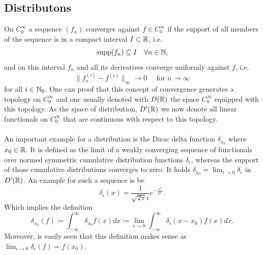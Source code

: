 \subsection*{Distributons}
	On $C_{0}^{\infty}$ a sequence $(f_{n})$ converges against $f \in C_{0}^{\infty}$ if the support of all members of the sequence is in a compact interval $I \subset \mathbb{R}$, i.e.
	$$ \operatorname{supp} (f_{n}) \subseteq I \quad \forall n \in \mathbb{N}, $$
	and on this interval $f_{n}$ and all its derivatives converge uniformly against $f$, i.e.
	\[ \| f_{n}^{(i)} - f^{(i)} \|_{\infty} \rightarrow 0 \quad \text{ for } n \rightarrow \infty \]
	for all $i \in \mathbb{N}_{0}$. One can proof that this concept of convergence generates a topology on $C_{0}^{\infty}$ and one usually denoted with $D(\mathbb{R})$ the space $C_{0}^{\infty}$ equipped with this topology. As the space of distribution, $D'(\mathbb{R})$ we now denote all linear functionals on $C_{0}^{\infty}$ that are continuous with respect to this topology.
~\\ ~\\ %
An important example for a distribution is the Dirac delta function $\delta_{x_{0}}$ where $x_{0} \in \mathbb{R}$. It is defined as the limit of a weakly converging sequence of functionals over normed symmetric cumulative distribution functions $\delta_{\epsilon}$, whereas the support of those cumulative distributions converges to zero. It holds $\delta_{x_{0}} = \lim_{\epsilon \rightarrow 0} \delta_{\epsilon}$ in $D'(\mathbb{R})$. An example for such a sequence is be %
	\[ \delta_{\epsilon}(x) = \frac{1}{\sqrt{2 \pi} \epsilon} e^{-\frac{x^{2}}{2 \epsilon^{2}}}. \]
Which implies the definition
	\[ \delta_{x_{0}}(f) \coloneqq \int_{-\infty}^{\infty} \delta_{x_{0}} f(x) dx \coloneqq \lim_{\epsilon \rightarrow 0} \int_{-\infty}^{\infty} \delta_{\epsilon}(x - x_{0}) f(x) dx. \]
Moreover, is easily seen that this definition makes sense as $\lim_{\epsilon \rightarrow 0} \delta_{\epsilon}(f) = f(x_{0})$. %
